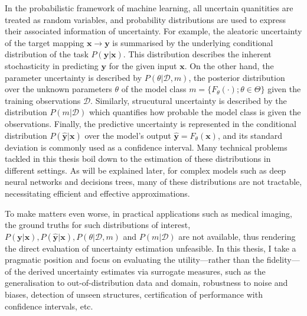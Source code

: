 In the probabilistic framework of machine learning, all uncertain quanitities are treated as random variables, and 
probability distributions are used to express their associated information of uncertainty. For example, the aleatoric uncertainty of the target mapping $\textbf{x} \rightarrow \mathbf{y}$ is summarised by the underlying conditional distribution of the task $P(\mathbf{y}|\mathbf{x})$. This distribution describes the inherent stochasticity in predicting $\mathbf{y}$ for the given input $\mathbf{x}$. On the other hand, the parameter uncertainty is described by $P(\theta|\mathcal{D}, m)$, the posterior distribution over the unknown parameters $\theta$ of the model class $m=\{F_{\theta}(\cdot); \theta \in \Theta\}$ given the training observations $\mathcal{D}$. Similarly, strucutural uncertainty is described by the distribution $P(m|\mathcal{D})$ which quantifies how probable the model class is given the observations. Finally, the predictive uncertainty is represented in the conditional distribution $P(\hat{\mathbf{y}}|\mathbf{x})$ over the model's output $\hat{\mathbf{y}}=F_{\theta}(\mathbf{x})$, and its standard deviation is commonly used as a confidence interval. Many technical problems tackled in this thesis boil down to the estimation of these distributions in different settings. As will be explained later, for complex models such as deep neural networks and decisions trees, many of these distributions are not tractable, necessitating efficient and effective approximations. 

To make matters even worse, in practical applications such as medical imaging, the ground truths for such distributions of interest, $P(\mathbf{y}|\mathbf{x}), P(\hat{\mathbf{y}}|\mathbf{x}), P(\theta|\mathcal{D}, m)$ and $P(m|\mathcal{D})$ are not available, thus rendering the direct evaluation of uncertainty estimation unfeasible. In this thesis, I take a pragmatic position and focus on evaluating the utility---rather than the fidelity---of the derived uncertainty estimates via surrogate measures, such as the generalisation to out-of-distribution data and domain, robustness to noise and biases, detection of unseen structures, certification of performance with confidence intervals, etc. 


